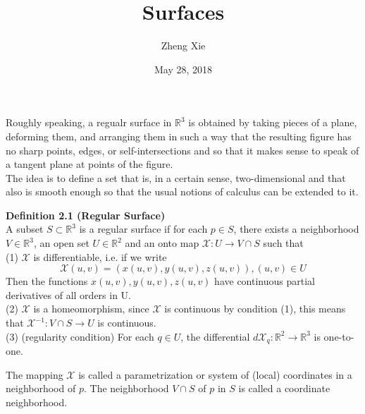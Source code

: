 \documentclass{article}
\author{Zheng Xie}
\title{Surfaces}
\date{May 28, 2018}
\begin{document}
\maketitle
    
\setlength\parindent{0em}   %
\setlength\parskip{1.0\baselineskip} %

\par
Roughly speaking, a regualr surface in $\mathbb{R}^3$ is obtained by taking pieces of a plane,
deforming them, and arranging them in such a way that the resulting figure has no sharp points, edges, or self-intersections
and so that it makes sense to speak of a tangent plane at points of the figure.\\
The idea is to define a set that is, in a certain sense, two-dimensional and that also is smooth
enough so that the usual notions of calculus can be extended to it.
    
\par
\textbf{Definition 2.1 (Regular Surface)}\\
A subset $S \subset \mathbb R^3$ is a regular surface if for each $p \in S$, there exists a neighborhood
$V \in \mathbb R^3$, an open set $U \in \mathbb R^2$ and an onto map $\mathcal{X}:U \to V \cap S$ such that\\
(1) $\mathcal{X}$ is differentiable, i.e. if we write\\
$$
    \mathcal{X}(u,v) = (x(u,v), y(u,v), z(u,v)), (u,v) \in U
$$
Then the functions $x(u,v), y(u,v), z(u,v)$ have continuous partial derivatives of all orders in U.\\
(2) $\mathcal{X}$ is a homeomorphism, since $\mathcal{X}$ is continuous by condition (1), this means that 
$\mathcal{X}^{-1}: V \cap S \to U$ is continuous.\\
(3) (regularity condition) For each $q \in U$, the differential $d\mathcal{X}_q: \mathbb{R}^2 \to \mathbb{R}^3$
is one-to-one.

\par
The mapping $\mathcal{X}$ is called a parametrization or system of (local) coordinates
in a neighborhood of $p$. The neighborhood $V \cap S$ of $p$ in $S$ is called a coordinate neighborhood.
\end{document}
